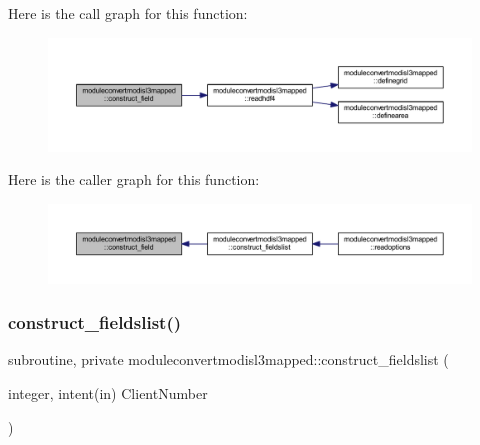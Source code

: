 Here is the call graph for this function\+:\nopagebreak
\begin{figure}[H]
\begin{center}
\leavevmode
\includegraphics[width=350pt]{namespacemoduleconvertmodisl3mapped_a74d74f88259002bec089959db1c1370b_cgraph}
\end{center}
\end{figure}
Here is the caller graph for this function\+:\nopagebreak
\begin{figure}[H]
\begin{center}
\leavevmode
\includegraphics[width=350pt]{namespacemoduleconvertmodisl3mapped_a74d74f88259002bec089959db1c1370b_icgraph}
\end{center}
\end{figure}
\mbox{\label{namespacemoduleconvertmodisl3mapped_a9ccec60dccec78cdbd1bb6e2b82e4c6b}} 
\subsubsection{\texorpdfstring{construct\+\_\+fieldslist()}{construct\_fieldslist()}}
{\footnotesize\ttfamily subroutine, private moduleconvertmodisl3mapped\+::construct\+\_\+fieldslist (\begin{DoxyParamCaption}\item[{integer, intent(in)}]{Client\+Number }\end{DoxyParamCaption})\hspace{0.3cm}{\ttfamily [private]}}

